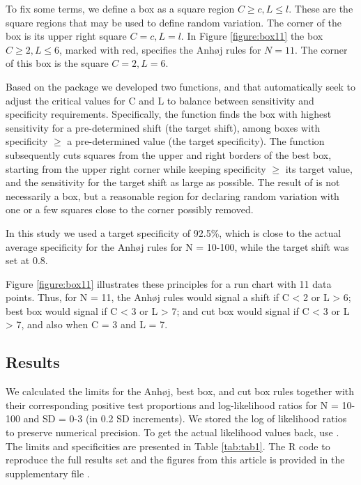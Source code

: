 To fix some terms, we define a box as a square region
\(C \geq c, L \leq l\). These are the square regions that may be used to
define random variation. The corner of the box is its upper right square
\(C = c, L = l\). In Figure \ref{figure:box11} the box
\(C \geq 2, L \leq 6\), marked with red, specifies the Anhøj rules for
\(N=11\). The corner of this box is the square \(C = 2, L = 6\).

Based on the  package we developed two functions,
 and  that automatically seek to adjust
the critical values for C and L to balance between sensitivity and
specificity requirements. Specifically, the  function
finds the box with highest sensitivity for a pre-determined shift (the
target shift), among boxes with specificity \(\geq\) a pre-determined
value (the target specificity). The  function
subsequently cuts squares from the upper and right borders of the best
box, starting from the upper right corner while keeping specificity
\(\geq\) its target value, and the sensitivity for the target shift as
large as possible. The result of  is not necessarily a
box, but a reasonable region for declaring random variation with one or
a few squares close to the corner possibly removed.

In this study we used a target specificity of 92.5\%, which is close to
the actual average specificity for the Anhøj rules for N = 10-100, while
the target shift was set at 0.8.

Figure \ref{figure:box11} illustrates these principles for a run chart
with 11 data points. Thus, for N = 11, the Anhøj rules would signal a
shift if C \textless{} 2 or L \textgreater{} 6; best box would signal if
C \textless{} 3 or L \textgreater{} 7; and cut box would signal if C
\textless{} 3 or L \textgreater{} 7, and also when C = 3 and L = 7.

\hypertarget{results}{%
\subsection{Results}\label{results}}

We calculated the limits for the Anhøj, best box, and cut box rules
together with their corresponding positive test proportions and
log-likelihood ratios for N = 10-100 and SD = 0-3 (in 0.2 SD
increments). We stored the log of likelihood ratios to preserve
numerical precision. To get the actual likelihood values back, use
. The limits and specificities are presented
in Table \ref{tab:tab1}. The R code to reproduce the full results set
and the figures from this article is provided in the supplementary file
.

